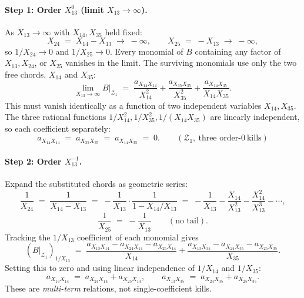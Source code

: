 \documentclass[11pt]{article}
\newcommand{\Zr}{\mathcal{Z}}
\begin{document}
\paragraph{Step 1: Order $X_{13}^0$ (limit $X_{13} \to \infty$).}
As $X_{13} \to \infty$ with $X_{14}, X_{35}$ held fixed:
\[
X_{24} \;=\; X_{14} - X_{13} \;\to\; -\infty,
\qquad X_{25} \;=\; -X_{13} \;\to\; -\infty,
\]
so $1/X_{24} \to 0$ and $1/X_{25} \to 0$. Every monomial of $B$
containing any factor of $X_{13}, X_{24}$, or $X_{25}$ vanishes in the
limit. The surviving monomials use only the two free chords, $X_{14}$
and $X_{35}$:
\[
\lim_{X_{13}\to\infty} B\big|_{\Zr_1}
\;=\; \frac{a_{X_{14} X_{14}}}{X_{14}^2}
   + \frac{a_{X_{35} X_{35}}}{X_{35}^2}
   + \frac{a_{X_{14} X_{35}}}{X_{14} X_{35}}.
\]
This must vanish identically as a function of two independent variables
$X_{14}, X_{35}$. The three rational functions $1/X_{14}^2, 1/X_{35}^2,
1/(X_{14} X_{35})$ are linearly independent, so each coefficient
separately:
\[
\boxed{a_{X_{14} X_{14}} \;=\; a_{X_{35} X_{35}} \;=\; a_{X_{14} X_{35}} \;=\; 0.
\qquad (\Zr_1,\ \text{three order-}0\ \text{kills})}
\]

\paragraph{Step 2: Order $X_{13}^{-1}$.}
Expand the substituted chords as geometric series:
\[
\frac{1}{X_{24}} \;=\; \frac{1}{X_{14} - X_{13}}
\;=\; -\frac{1}{X_{13}}\cdot\frac{1}{1 - X_{14}/X_{13}}
\;=\; -\frac{1}{X_{13}} - \frac{X_{14}}{X_{13}^2}
      - \frac{X_{14}^2}{X_{13}^3} - \cdots,
\]
\[
\frac{1}{X_{25}} \;=\; -\frac{1}{X_{13}}\qquad (\text{no tail}).
\]
Tracking the $1/X_{13}$ coefficient of each monomial gives
\[
\left(B\big|_{\Zr_1}\right)_{1/X_{13}}
\;=\; \frac{a_{X_{13} X_{14}} - a_{X_{24} X_{14}} - a_{X_{25} X_{14}}}{X_{14}}
    + \frac{a_{X_{13} X_{35}} - a_{X_{24} X_{35}} - a_{X_{25} X_{35}}}{X_{35}}.
\]
Setting this to zero and using linear independence of $1/X_{14}$ and
$1/X_{35}$:
\[
a_{X_{13} X_{14}} \;=\; a_{X_{24} X_{14}} + a_{X_{25} X_{14}},
\qquad
a_{X_{13} X_{35}} \;=\; a_{X_{24} X_{35}} + a_{X_{25} X_{35}}.
\]
These are \emph{multi-term} relations, not single-coefficient kills.
\end{document}
